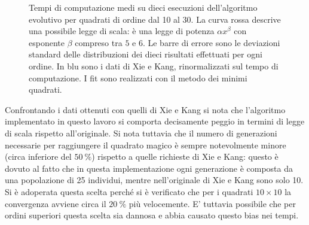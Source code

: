 \documentclass[italian,twoside,twocolumn]{article}
\begin{document}
\begin{figure}[htbp]
	\centering
	\caption{Tempi di computazione medi su dieci esecuzioni dell'algoritmo evolutivo per quadrati di ordine dal 10 al 30. La curva rossa descrive una possibile legge di scala: è una legge di potenza $ \alpha x^{\beta} $ con esponente $ \beta $ compreso tra $ 5 $ e $ 6 $. Le barre di errore sono le deviazioni standard delle distribuzioni dei dieci risultati effettuati per ogni ordine. In blu sono i dati di Xie e Kang, rinormalizzati sul tempo di computazione. I fit sono realizzati con il metodo dei minimi quadrati.}
	\label{fig:scala_xie_kang}
\end{figure}

Confrontando i dati ottenuti con quelli di Xie e Kang si nota che l'algoritmo implementato in questo lavoro si comporta decisamente peggio in termini di legge di scala rispetto all'originale. Si nota tuttavia che il numero di generazioni necessarie per raggiungere il quadrato magico è sempre notevolmente minore (circa inferiore del $ \SI{50}{\percent} $) rispetto a quelle richieste di Xie e Kang: questo è dovuto al fatto che in questa implementazione ogni generazione è composta da una popolazione di 25 individui, mentre nell'originale di Xie e Kang sono solo 10. Si è adoperata questa scelta perché si è verificato che per i quadrati $ 10\times 10 $ la convergenza avviene circa il $ \SI{20}{\percent} $ più velocemente. E' tuttavia possibile che per ordini superiori questa scelta sia dannosa e abbia causato questo bias nei tempi.
\end{document}
